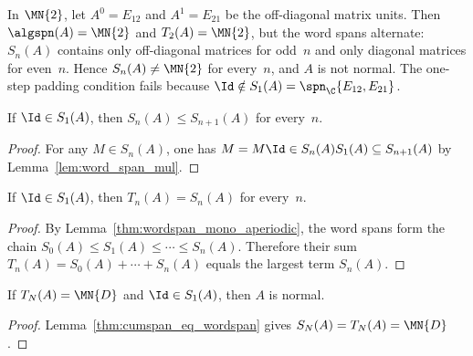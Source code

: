 \begin{remark}%
    \label{rem:cumspan_counterexample}\leanok
    In $\MN{2}$, let $A^0=E_{12}$ and $A^1=E_{21}$ be the off-diagonal
    matrix units.
    Then $\algspn(A)=\MN{2}$ and $T_2(A)=\MN{2}$, but the word spans
    alternate: $S_n(A)$ contains only off-diagonal matrices for odd~$n$
    and only diagonal matrices for even~$n$.
    Hence $S_n(A)\neq\MN{2}$ for every~$n$, and $A$ is not normal.
    The one-step padding condition fails because
    $\Id\notin S_1(A)=\spn_{\C}\{E_{12},E_{21}\}$.
\end{remark}

\begin{lemma}%
    \label{thm:wordspan_mono_aperiodic}
    \leanok
    If $\Id\in S_1(A)$, then $S_n(A)\le S_{n+1}(A)$ for every~$n$.
\end{lemma}

\begin{proof}\leanok{}
    For any $M\in S_n(A)$, one has
    $M=M\Id\in S_n(A)S_1(A)\subseteq S_{n+1}(A)$ by
    Lemma~\ref{lem:word_span_mul}.
\end{proof}

\begin{lemma}%
    \label{thm:cumspan_eq_wordspan}
    \leanok
    If $\Id\in S_1(A)$, then $T_n(A)=S_n(A)$ for every~$n$.
\end{lemma}

\begin{proof}\leanok{}
    By Lemma~\ref{thm:wordspan_mono_aperiodic}, the word spans form the
    chain $S_0(A)\le S_1(A)\le\cdots\le S_n(A)$.
    Therefore their sum $T_n(A)=S_0(A)+\cdots+S_n(A)$ equals the largest
    term $S_n(A)$.
\end{proof}

\begin{lemma}%
    \label{thm:cumspan_to_normal}
    \leanok
    If $T_N(A)=\MN{D}$ and $\Id\in S_1(A)$, then $A$ is normal.
\end{lemma}

\begin{proof}\leanok{}
    Lemma~\ref{thm:cumspan_eq_wordspan} gives
    $S_N(A)=T_N(A)=\MN{D}$.
\end{proof}

